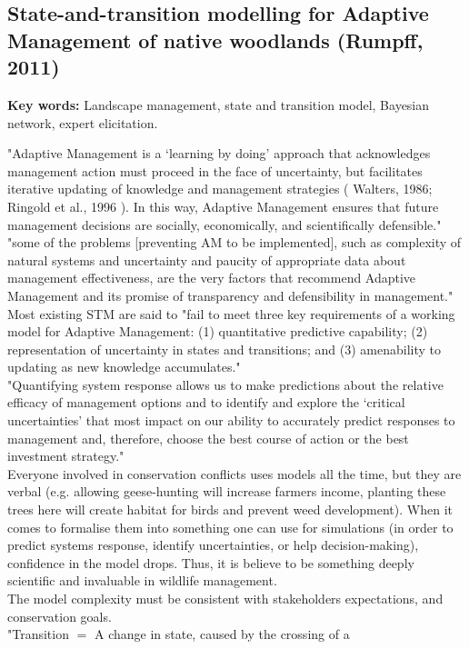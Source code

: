 \documentclass[12pt]{article}
\begin{document}
\subsection{State-and-transition modelling for Adaptive Management of native woodlands (Rumpff, 2011)}
\textbf{Key words:} Landscape management, state and transition model, Bayesian network, expert elicitation.

"Adaptive Management is a ‘learning by doing’
approach that acknowledges management action must proceed
in the face of uncertainty, but facilitates iterative updating of
knowledge and management strategies (
Walters, 1986; Ringold
et al., 1996
). In this way, Adaptive Management ensures that future
management decisions are socially, economically, and scientifically
defensible."\\
"some of the problems
[preventing AM to be implemented], such as complexity of natural systems and uncertainty and
paucity of appropriate data about management effectiveness, are
the very factors that recommend Adaptive Management and its
promise of transparency and defensibility in management."\\
Most existing STM are said to "fail to meet three key requirements of a working model
for Adaptive Management: (1) quantitative predictive capability;
(2) representation of uncertainty in states and transitions; and
(3) amenability to updating as new knowledge accumulates."\\
"Quantifying system response allows us to make predictions about
the relative efficacy of management options and to identify and explore the ‘critical uncertainties’ that most impact on our ability to
accurately predict responses to management and, therefore,
choose the best course of action or the best investment strategy."\\
Everyone involved in conservation conflicts uses models all the time, but they are verbal (e.g. allowing geese-hunting will increase farmers income, planting these trees here will create habitat for birds and prevent weed development). When it comes to formalise them into something one can use for simulations (in order to predict systems response, identify uncertainties, or help decision-making), confidence in the model drops. Thus, it is believe to be something deeply scientific and invaluable in wildlife management.\\
The model complexity must be consistent with stakeholders expectations, and conservation goals.\\
"Transition $=$ A change in state, caused by the crossing of a
\end{document}

